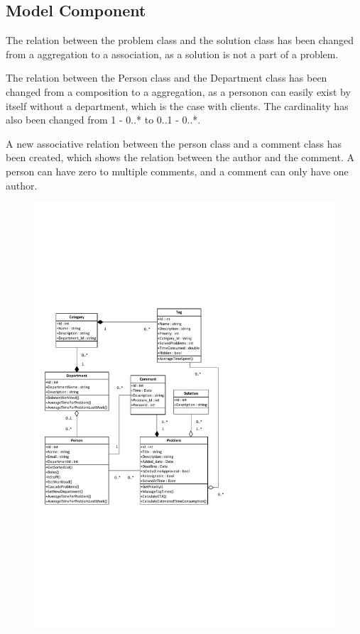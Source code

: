 \subsection*{Model Component}
The relation between the problem class and the solution class has been changed from a aggregation to a association, as a solution is not a part of a problem.

The relation between the Person class and the Department class has been changed from a composition to a aggregation, as a personon can easily exist by itself without a department, which is the case with clients. The cardinality has also been changed from 1 - 0..* to 0..1 - 0..*.

A new associative relation between the person class and a comment class has been created, which shows the relation between the author and the comment. A person can have zero to multiple comments, and a comment can only have one author.
	

\begin{figure}[p]%
\includegraphics[clip=true, height=1.0\textwidth, trim=0.5cm 5cm 7.5cm 7cm]{ClassDiagramV3.pdf}%
\label{fig:modelcomponent}
\end{figure}

